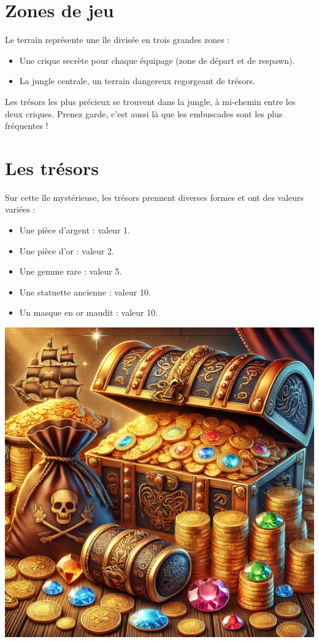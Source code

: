 \documentclass{pirategame}
\begin{document}
\section{Zones de jeu}
Le terrain représente une île divisée en trois grandes zones :
\begin{itemize}
    \item Une crique secrète pour chaque équipage (zone de départ et de respawn).
    \item La jungle centrale, un terrain dangereux regorgeant de trésors.
\end{itemize}

Les trésors les plus précieux se trouvent dans la jungle, à mi-chemin entre les deux criques. Prenez garde, c'est aussi là que les embuscades sont les plus fréquentes !

\section{Les trésors}

Sur cette île mystérieuse, les trésors prennent diverses formes et ont des valeurs variées :

\begin{minipage}[t]{0.7\textwidth}
  \begin{itemize}[series=treasures]
      \item Une pièce d'argent : valeur 1.
      \item Une pièce d'or : valeur 2.
      \item Une gemme rare : valeur 5.
      \item Une statuette ancienne : valeur 10.
      \item Un masque en or maudit : valeur 10.
  \end{itemize}
\end{minipage}
\hfill
\begin{minipage}[t]{0.28\textwidth}
  \vspace{0em}
  \includegraphics[width=\linewidth]{img/tresors.png}
\end{minipage}
\end{document}
